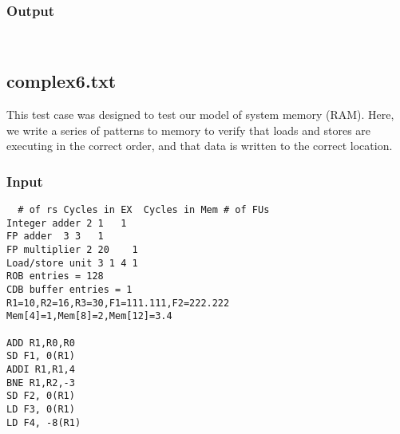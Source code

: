 \documentclass[12pt]{article}
\begin{document}

\subsubsection*{Output}
\begin{verbatim}
    
\end{verbatim}

\subsection{complex6.txt}
This test case was designed to test our model of system memory (RAM).  Here, we write a series of patterns to memory to verify that loads and stores are executing in the correct order, and that data is written to the correct location.

\subsubsection*{Input}
\begin{verbatim}
  # of rs Cycles in EX  Cycles in Mem # of FUs
Integer adder 2 1   1
FP adder  3 3   1
FP multiplier 2 20    1
Load/store unit 3 1 4 1
ROB entries = 128
CDB buffer entries = 1
R1=10,R2=16,R3=30,F1=111.111,F2=222.222
Mem[4]=1,Mem[8]=2,Mem[12]=3.4

ADD R1,R0,R0
SD F1, 0(R1)
ADDI R1,R1,4
BNE R1,R2,-3
SD F2, 0(R1)
LD F3, 0(R1)
LD F4, -8(R1)
\end{verbatim}
\end{document}
